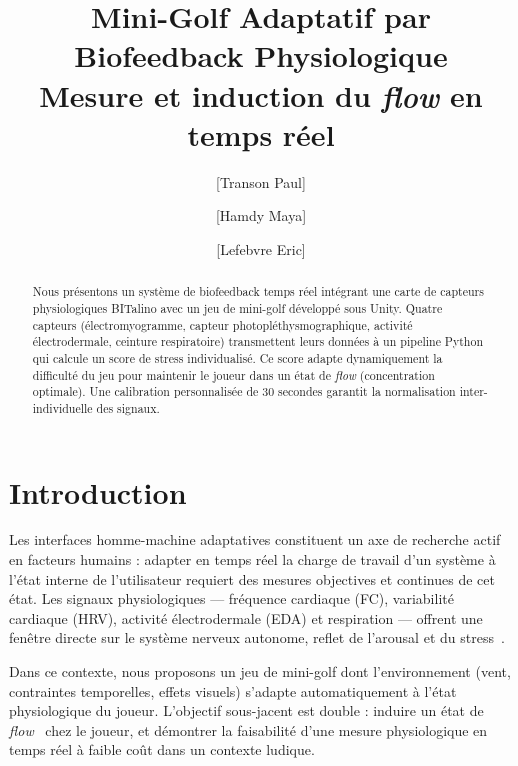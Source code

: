 \documentclass[runningheads]{llncs}
\begin{document}
\title{Mini-Golf Adaptatif par Biofeedback Physiologique\\
\large Mesure et induction du \textit{flow} en temps réel}

\author{[Transon Paul] \and
        [Hamdy Maya] \and
        [Lefebvre Eric]}




\maketitle

\begin{abstract}
Nous présentons un système de biofeedback temps réel intégrant une carte
de capteurs physiologiques BITalino avec un jeu de mini-golf développé
sous Unity. Quatre capteurs (électromyogramme, capteur photopléthysmographique,
activité électrodermale, ceinture respiratoire) transmettent leurs données
à un pipeline Python qui calcule un score de stress individualisé. Ce score
adapte dynamiquement la difficulté du jeu pour maintenir le joueur dans un
état de \textit{flow} (concentration optimale). Une calibration personnalisée
de 30 secondes garantit la normalisation inter-individuelle des signaux.
\end{abstract}

\section{Introduction}

Les interfaces homme-machine adaptatives constituent un axe de recherche
actif en facteurs humains : adapter en temps réel la charge de travail d'un
système à l'état interne de l'utilisateur requiert des mesures objectives et
continues de cet état. Les signaux physiologiques — fréquence cardiaque (FC),
variabilité cardiaque (HRV), activité électrodermale (EDA) et respiration —
offrent une fenêtre directe sur le système nerveux autonome, reflet de
l'arousal et du stress~\cite{healey2005}.

Dans ce contexte, nous proposons un jeu de mini-golf dont l'environnement
(vent, contraintes temporelles, effets visuels) s'adapte automatiquement à
l'état physiologique du joueur. L'objectif sous-jacent est double : induire
un état de \textit{flow}~\cite{csikszentmihalyi1990} chez le joueur, et
démontrer la faisabilité d'une mesure physiologique en temps réel à faible
coût dans un contexte ludique.
\end{document}
